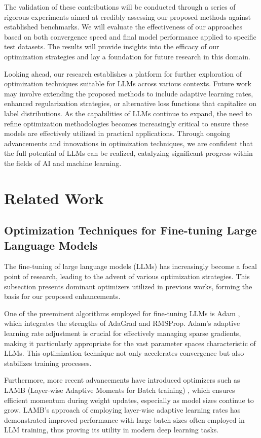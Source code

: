\documentclass{article} %
\begin{document}
The validation of these contributions will be conducted through a series of rigorous experiments aimed at credibly assessing our proposed methods against established benchmarks. We will evaluate the effectiveness of our approaches based on both convergence speed and final model performance applied to specific test datasets. The results will provide insights into the efficacy of our optimization strategies and lay a foundation for future research in this domain.

Looking ahead, our research establishes a platform for further exploration of optimization techniques suitable for LLMs across various contexts. Future work may involve extending the proposed methods to include adaptive learning rates, enhanced regularization strategies, or alternative loss functions that capitalize on label distributions. As the capabilities of LLMs continue to expand, the need to refine optimization methodologies becomes increasingly critical to ensure these models are effectively utilized in practical applications. Through ongoing advancements and innovations in optimization techniques, we are confident that the full potential of LLMs can be realized, catalyzing significant progress within the fields of AI and machine learning.

\section{Related Work}
\label{sec:related}
\subsection{Optimization Techniques for Fine-tuning Large Language Models}

The fine-tuning of large language models (LLMs) has increasingly become a focal point of research, leading to the advent of various optimization strategies. This subsection presents dominant optimizers utilized in previous works, forming the basis for our proposed enhancements.

One of the preeminent algorithms employed for fine-tuning LLMs is Adam \cite{kingma2014adam}, which integrates the strengths of AdaGrad and RMSProp. Adam's adaptive learning rate adjustment is crucial for effectively managing sparse gradients, making it particularly appropriate for the vast parameter spaces characteristic of LLMs. This optimization technique not only accelerates convergence but also stabilizes training processes.

Furthermore, more recent advancements have introduced optimizers such as LAMB (Layer-wise Adaptive Moments for Batch training) \cite{you2019large}, which ensures efficient momentum during weight updates, especially as model sizes continue to grow. LAMB's approach of employing layer-wise adaptive learning rates has demonstrated improved performance with large batch sizes often employed in LLM training, thus proving its utility in modern deep learning tasks.
\end{document}
